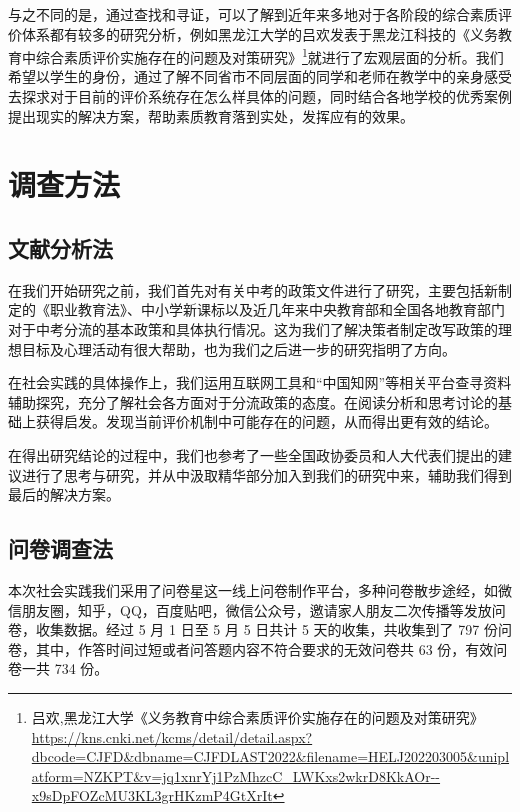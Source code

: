 \documentclass[12pt,UTF8]{ctexart}
\begin{document}
\par{与之不同的是，通过查找和寻证，可以了解到近年来多地对于各阶段的综合素质评价体系都有较多的研究分析，例如黑龙江大学的吕欢发表于黑龙江科技的《义务教育中综合素质评价实施存在的问题及对策研究》\footnote{吕欢,黑龙江大学《义务教育中综合素质评价实施存在的问题及对策研究》
		\url{https://kns.cnki.net/kcms/detail/detail.aspx?dbcode=CJFD&dbname=CJFDLAST2022&filename=HELJ202203005&uniplatform=NZKPT&v=jq1xnrYj1PzMhzcC_LWKxs2wkrD8KkAOr--x9sDpFOZcMU3KL3grHKzmP4GtXrIt}}就进行了宏观层面的分析。}我们希望以学生的身份，通过了解不同省市不同层面的同学和老师在教学中的亲身感受去探求对于目前的评价系统存在怎么样具体的问题，同时结合各地学校的优秀案例提出现实的解决方案，帮助素质教育落到实处，发挥应有的效果。
\newpage

\section {调查方法}
\subsection {文献分析法}
\par{在我们开始研究之前，我们首先对有关中考的政策文件进行了研究，主要包括新制定的《职业教育法》、中小学新课标以及近几年来中央教育部和全国各地教育部门对于中考分流的基本政策和具体执行情况。这为我们了解决策者制定改写政策的理想目标及心理活动有很大帮助，也为我们之后进一步的研究指明了方向。}

\par{在社会实践的具体操作上，我们运用互联网工具和“中国知网”等相关平台查寻资料辅助探究，充分了解社会各方面对于分流政策的态度。在阅读分析和思考讨论的基础上获得启发。发现当前评价机制中可能存在的问题，从而得出更有效的结论。}

\par{在得出研究结论的过程中，我们也参考了一些全国政协委员和人大代表们提出的建议进行了思考与研究，并从中汲取精华部分加入到我们的研究中来，辅助我们得到最后的解决方案。}

\subsection {问卷调查法}
\par{本次社会实践我们采用了问卷星这一线上问卷制作平台，多种问卷散步途经，如微信朋友圈，知乎，QQ，百度贴吧，微信公众号，邀请家人朋友二次传播等发放问卷，收集数据。经过
	5 月 1 日至 5 月 5 日共计 5 天的收集，共收集到了 797 份问卷，其中，作答时间过短或者问答题内容不符合要求的无效问卷共 63 份，有效问卷一共
	734 份。}
\end{document}
